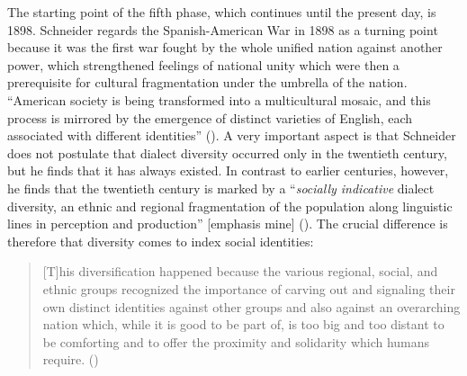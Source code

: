 \largerpage
The starting point of the fifth phase, which continues until the present day, is 1898. Schneider regards the Spanish-American War in 1898 as a turning point because it was the first war fought by the whole unified nation against another power, which strengthened feelings of national unity which were then a prerequisite for cultural fragmentation under the umbrella of the nation. “American society is being transformed into a multicultural mosaic, and this process is mirrored by the emergence of distinct varieties of English, each associated with different identities” (\citeyear[294]{Schneider2007}). A very important aspect is that Schneider does not postulate that dialect diversity occurred only in the twentieth century, but he finds that it has always existed. In contrast to earlier centuries, however, he finds that the twentieth century is marked by a “\emph{socially indicative} dialect diversity, an ethnic and regional fragmentation of the population along linguistic lines in perception and production” [emphasis mine] (\citeyear[296]{Schneider2007}). The crucial difference is therefore that diversity comes to index social identities:

\begin{quote}
[T]his diversification happened because the various regional, social, and ethnic groups recognized the importance of carving out and signaling their own distinct identities against other groups and also against an overarching nation which, while it is good to be part of, is too big and too distant to be comforting and to offer the proximity and solidarity which humans require. (\citeyear[296]{Schneider2007})
\end{quote}


